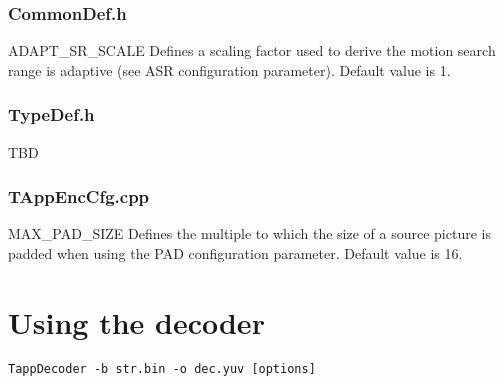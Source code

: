 \documentclass[a4paper,11pt]{jctvcdoc}
\begin{document}
\subsubsection*{CommonDef.h}
ADAPT_SR_SCALE
Defines a scaling factor used to derive the motion search range is
adaptive (see ASR configuration parameter). Default value is 1.

\subsubsection*{TypeDef.h}
TBD

\subsubsection*{TAppEncCfg.cpp}
MAX_PAD_SIZE
Defines the multiple to which the size of a source picture is padded
when using the PAD configuration parameter. Default value is 16.


\clearpage
\section{Using the decoder}
\begin{verbatim}
TappDecoder -b str.bin -o dec.yuv [options]
\end{verbatim}
\end{document}
